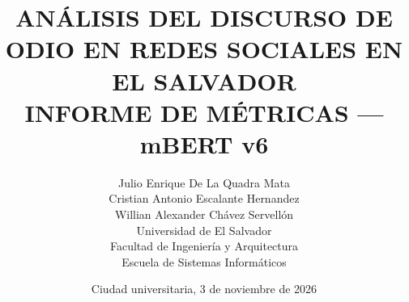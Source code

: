 \title{%
  \vspace{1.5cm}
  {\Large ANÁLISIS DEL DISCURSO DE ODIO EN REDES SOCIALES EN EL SALVADOR}\\[0.8cm]
  {\large INFORME DE MÉTRICAS --- mBERT v6}\\[1.5cm]
}
\author{%
  Julio Enrique De La Quadra Mata\\
  Cristian Antonio Escalante Hernandez\\
  Willian Alexander Chávez Servellón\\[1.2cm]
  {\normalsize Universidad de El Salvador}\\
  {\normalsize Facultad de Ingeniería y Arquitectura}\\
  {\normalsize Escuela de Sistemas Informáticos}
}
\date{Ciudad universitaria, 3 de noviembre de 2026}
